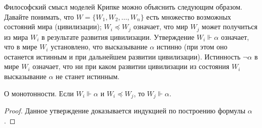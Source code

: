 Философский смысл моделей Крипке можно объяснить следующим образом. Давайте понимать, 
что $W = \{ W_1, W_2, \dots, W_n\}$  есть множество возможных состояний мира (цивилизации); 
$W_i \preceq W_j$ означает, что мир $W_j$ может получиться 
из мира $W_i$ в результате развития цивилизации. Утверждение $W_i \Vdash \alpha$ означает, 
что в мире  $W_i$ установлено, что высказывание $\alpha$ истинно 
(при этом оно останется истинным и при дальнейшем развитии цивилизации). Истинность $\neg\alpha$ 
в мире $W_i$ означает, что ни при каком развитии цивилизации из 
состояния $W_i$ высказывание $\alpha$ не станет истинным.


\begin{lemma}{О монотонности.}
Если $W_i \Vdash \alpha$ и $W_i \preceq W_j$, то $W_j \Vdash \alpha$.
\end{lemma}
\begin{proof} 
Данное утверждение доказывается индукцией по построению формулы $\alpha$.
\end{proof}


